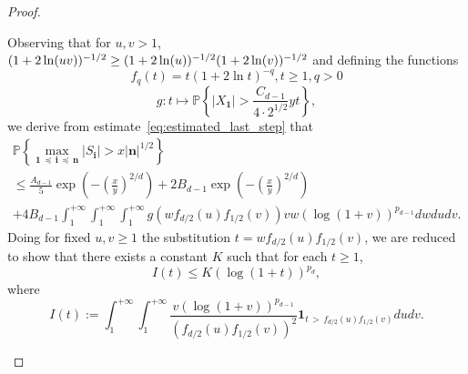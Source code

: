 \documentclass[10pt]{amsart}
\theoremstyle{definition}\newtheorem{defi}[theo]{Definition}\newtheorem{rema}[theo]{Remark}\newtheorem{exam}[theo]{Example}\newtheorem{exem}[theo]{Example}\newtheorem{nota}[theo]{Notation}
\newcommand{\bfun}{\mathbf{1}}
\newcommand\PP{\mathbb{P}}
\newcommand{\pr}[1]{(#1)}
\newcommand{\gr}[1]{\bm{#1}}
\newcommand{\gri}{\bm{i}}
\newcommand{\grn}{\bm{n}}
\newcommand{\imd}{\preccurlyeq}
\begin{document}
\begin{proof}
\begin{itemize}
Observing that for $u,v>1$, $\pr{1+2\ln\pr{uv}}^{-1/2}\geq
\pr{1+2\ln\pr{u}}^{-1/2}\linebreak\pr{1+2\ln\pr{v}}^{-1/2}$ and defining the functions
\begin{equation}
f_q\pr{t}=t\left(1+2\ln t\right)^{-q}, t\geq 1, q>0
\end{equation}
\begin{equation}
g\colon t\mapsto \PP\left\{\left|X_{\gr{1}}\right|>
\frac{C_{d-1}}{4\cdot 2^{1/2}}yt \right\},
\end{equation}
we derive from estimate~\eqref{eq:estimated_last_step} that
\begin{multline}\label{eq:estimated_last_step_bis}
\PP\left\{\max_{\gr{1}\,\imd\,\gri\,\imd\,\gr{n}} \left|S_{\gri}\right| >x\left|\grn\right|^{1/2}\right\}\\
\leq
\frac{A_{d-1}}5\exp\left(-\left(\frac xy\right)^{2/d}\right)+ 2B_{d-1}\exp\left(-\left(\frac{x}{y}\right)^{2/d}\right) \\
+ 4B_{d-1}\int_1^{+\infty}\int_1^{+\infty}\int_1^{+\infty} g\left(w f_{d/2}\pr{u}f_{1/2}\pr{v}\right) vw\left(\log\pr{1+v}\right)^{p_{d-1}}dwdudv.
\end{multline}
Doing for fixed $u,v\geq 1$ the substitution $t=w f_{d/2}\pr{u}f_{1/2}\pr{v}$, we are reduced to show that there exists a constant $K$ such that for each $t\geq 1$,
\begin{equation}
I\pr{t}\leq K\left( \log\pr{1+t} \right)^{p_d},
\end{equation}
where
\begin{equation}
I\pr{t}:= \int_1^{+\infty}\int_1^{+\infty}\frac{v\left(\log\pr{1+v}\right)^{p_{d-1}} }{\left(f_{d/2}\pr{u}f_{1/2}\pr{v}\right)^2}
\bfun_{t\,>\,f_{d/2}\pr{u}f_{1/2}\pr{v}}du dv.
\end{equation}



\end{itemize}
\end{proof}
\end{document}

